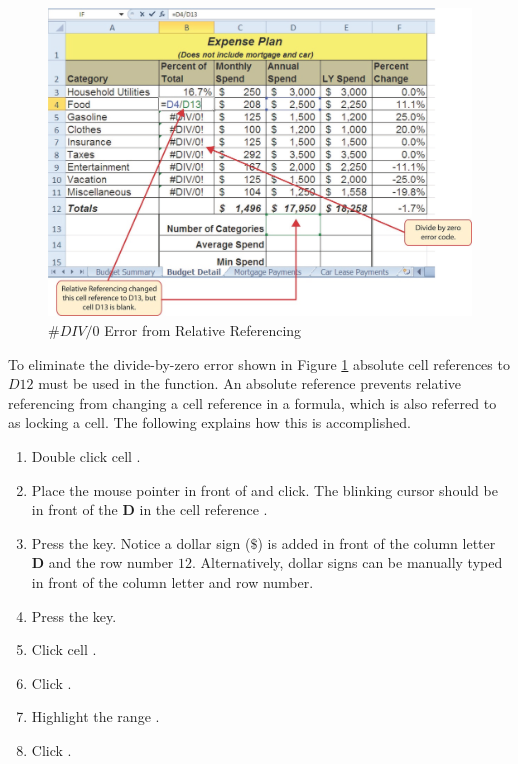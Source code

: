 \begin{figure}[H]
	\centering
	\includegraphics[width=\maxwidth{.95\linewidth}]{gfx/ch02_fig15}
	\caption{$ \#DIV/0 $ Error from Relative Referencing}
	\label{02:fig15}
\end{figure}

To eliminate the divide-by-zero error shown in Figure \ref{02:fig15} absolute cell references to $ D12 $ must be used in the function. An absolute reference prevents relative referencing from changing a cell reference in a formula, which is also referred to as locking a cell. The following explains how this is accomplished.

\begin{enumerate}
	\item Double click cell .
	\item Place the mouse pointer in front of  and click. The blinking cursor should be in front of the \textbf{D} in the cell reference .
	\item Press the  key. Notice a dollar sign ($ \$ $) is added in front of the column letter \textbf{D} and the row number \textbf{$ 12 $}. Alternatively, dollar signs can be manually typed in front of the column letter and row number.
	\item Press the  key.
	\item Click cell .
	\item Click .
	\item Highlight the range .
	\item Click .
\end{enumerate}

